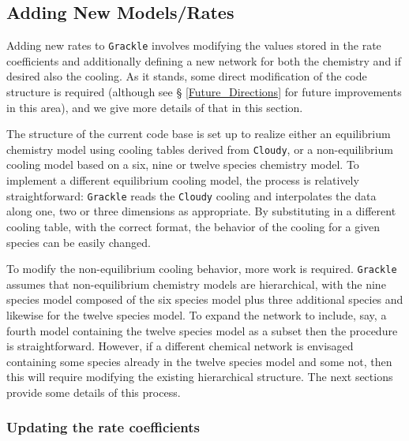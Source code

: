 
\subsection{Adding New Models/Rates}

Adding new rates to \texttt{Grackle} involves modifying the values stored in
the rate coefficients and additionally defining a new network for both
the chemistry and if desired also the cooling. As it stands, some
direct modification of the code structure is required (although see \S
\ref{Future_Directions} for future improvements in this area), and we
give more details of that in this section.

The structure of the current code base is set up to realize either an
equilibrium chemistry model using cooling tables derived from \texttt{Cloudy},
or a non-equilibrium cooling model based on a six, nine or twelve
species chemistry model.  To implement a different equilibrium cooling
model, the process is relatively straightforward: \texttt{Grackle} reads
the \texttt{Cloudy} cooling and interpolates the data along one, two or three
dimensions as appropriate. By substituting in a different cooling
table, with the correct format, the behavior of the cooling for a
given species can be easily changed.

To modify the non-equilibrium cooling behavior, more work is
required. \texttt{Grackle} assumes that non-equilibrium chemistry models are
hierarchical, with the nine species model composed of the six species
model plus three additional species and likewise for the twelve species model.
To expand the network to include, say, a fourth model containing the twelve species 
model as a subset then the procedure is straightforward. However, if a different
chemical network is envisaged containing some species already in the
twelve species model and some not, then this will require modifying
the existing hierarchical structure.  The next sections provide some
details of this process.

\subsubsection{Updating the rate coefficients}

